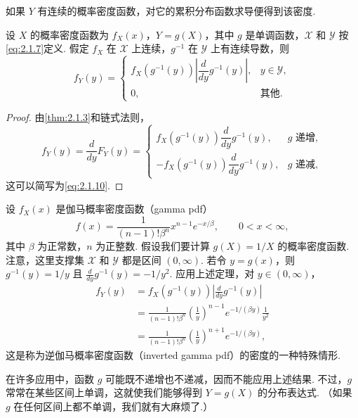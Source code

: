 如果 $Y$ 有连续的概率密度函数，对它的累积分布函数求导便得到该密度.
\begin{theorem}\label{thm:2.1.5}
设 $X$ 的概率密度函数为 $f_X(x)$，$Y=g(X)$，其中 $g$ 是单调函数，$\mathscr X$ 和 $\mathscr Y$ 按\eqref{eq:2.1.7}定义. 假定 $f_X$ 在 $\mathscr X$ 上连续，$g^{-1}$ 在 $\mathscr Y$ 上有连续导数，则
\begin{equation}\label{eq:2.1.10}
f_Y(y)=\begin{cases}
f_X(g^{-1}(y))\left|\dfrac d{dy}g^{-1}(y)\right|,&y\in\mathscr Y,\\
0,&\text{其他}.
\end{cases}
\end{equation}
\end{theorem}
\begin{proof}
由\autoref{thm:2.1.3}和链式法则，
$$f_Y(y)=\frac d{dy}F_Y(y)=\begin{cases}
f_X(g^{-1}(y))\dfrac d{dy}g^{-1}(y),&g\text{ 递增},\\
-f_X(g^{-1}(y))\dfrac d{dy}g^{-1}(y),&g\text{ 递减},
\end{cases}$$
这可以简写为\eqref{eq:2.1.10}.
\end{proof}

\begin{example}[逆伽马概率密度函数]\label{ex:2.1.6}
设 $f_X(x)$ 是伽马概率密度函数（gamma pdf）
$$f(x)=\frac1{(n-1)!\beta^n}x^{n-1}e^{-x/\beta},\qquad0<x<\infty,$$
其中 $\beta$ 为正常数，$n$ 为正整数. 假设我们要计算 $g(X)=1/X$ 的概率密度函数. 注意，这里支撑集 $\mathscr X$ 和 $\mathscr Y$ 都是区间 $(0,\infty)$. 若令 $y=g(x)$，则 $g^{-1}(y)=1/y$ 且 $\frac d{dy}g^{-1}(y)=-1/y^2$. 应用上述定理，对 $y\in(0,\infty)$，
$$\begin{aligned}
f_Y(y)&=f_X(g^{-1}(y))\left|\frac d{dy}g^{-1}(y)\right|\\
&=\frac1{(n-1)!\beta^n}\left(\frac1y\right)^{n-1}e^{-1/(\beta y)}\frac1{y^2}\\
&=\frac1{(n-1)!\beta^n}\left(\frac1y\right)^{n+1}e^{-1/(\beta y)},
\end{aligned}$$
这是称为逆伽马概率密度函数（inverted gamma pdf）的密度的一种特殊情形.
\end{example}

在许多应用中，函数 $g$ 可能既不递增也不递减，因而不能应用上述结果. 不过，$g$ 常常在某些区间上单调，这就使我们能够得到 $Y=g(X)$ 的分布表达式. （如果 $g$ 在任何区间上都不单调，我们就有大麻烦了.）

